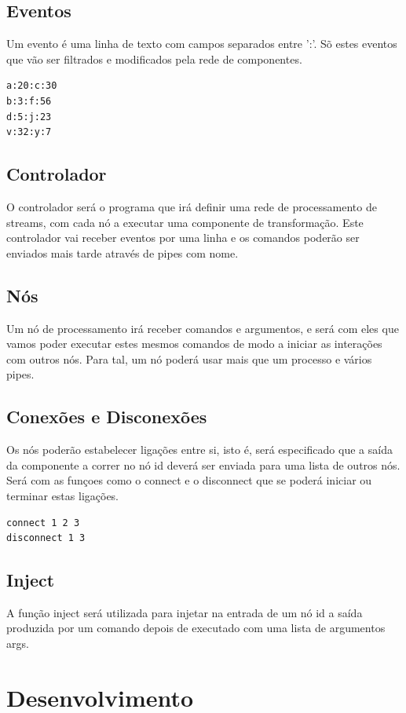 \documentclass{report}
\begin{document}
\section{Eventos}
Um evento é uma linha de texto com campos separados entre ':'. Sõ estes eventos que vão ser filtrados e modificados pela rede de componentes.

\begin{verbatim}
a:20:c:30
b:3:f:56
d:5:j:23
v:32:y:7
\end{verbatim}

\section{Controlador}
O controlador será o programa que irá definir uma rede de processamento de streams, com cada nó a executar uma componente de transformação. Este controlador vai receber eventos por uma linha e os comandos poderão ser enviados mais tarde através de pipes com nome.

\section{Nós}
Um nó de processamento irá receber comandos e argumentos, e será com eles que vamos poder executar estes mesmos comandos de modo a iniciar as interações com outros nós. Para tal, um nó poderá usar mais que um processo e vários pipes.

\section{Conexões e Disconexões}
Os nós poderão estabelecer ligações entre si, isto é, será especificado que a saída da componente a correr no nó id deverá ser enviada para uma lista de outros nós. Será com as funçoes como o connect e o disconnect que se poderá iniciar ou terminar estas ligações.

\begin{verbatim}
connect 1 2 3 
disconnect 1 3
\end{verbatim}

\section{Inject}
A função inject será utilizada para injetar na entrada de um nó id a saída produzida por um comando depois de executado com uma lista de argumentos args.
\newpage
\chapter{Desenvolvimento}
\end{document}
